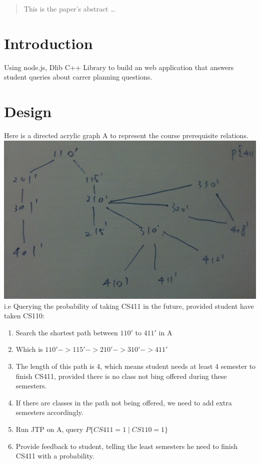 \documentclass[12pt]{article}
\begin{document}
\maketitle

\begin{abstract}
This is the paper's abstract \ldots
\end{abstract}


\section{Introduction}
Using node.js, Dlib C++ Library to build an web application that answers student queries about carrer planning questions.

\section{Design}
Here is a directed acrylic graph A to represent the course prerequisite relations.\\
\includegraphics[scale=0.3]{g1_1.jpg}\\

i.e Querying the probability of taking CS411 in the future, provided student have taken CS110:\\
\begin{enumerate}
	\item Search the shortest path between $110'$ to $411'$ in A\\
	\item Which is $110' -> 115' -> 210' -> 310' -> 411'$\\
	\item The length of this path is 4, which means student needs at least 4 semester to finish CS411, provided there is no class not bing offered during these semesters.\\
	\item If there are classes in the path not being offered, we need to add extra semesters accordingly.\\
	\item Run JTP on A, query $P\{CS411 = 1 \mid CS110 = 1\}$\\
	\item Provide feedback to student, telling the least semesters he need to finish CS411 with a probability.\\
\end{enumerate}
\end{document}
